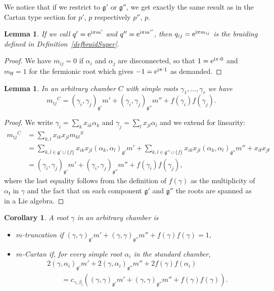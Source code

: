 \documentclass[pdftex]{sigma}%
\numberwithin{equation}{section}
\newtheorem{cor}[teo]{Corollary}
\newtheorem{lem}[teo]{Lemma}
\newcommand{\f}{\mathsf{f}}
\begin{document}
We notice that if we restrict to $\mathfrak{g'}$ or $\mathfrak{g''}$, we get exactly the same result as in the Cartan type section for $p'$, $p$ respectively $p''$, $p$.
\begin{lem}
If we call $q'={\rm e}^{{\rm i} \pi m'}$ and $q''={\rm e}^{{\rm i} \pi m''}$, then $q_{ij}={\rm e}^{{\rm i} \pi m_{ij}}$ is the braiding defined in Definition~{\rm \ref{defbraidSuper}}.
\end{lem}
\begin{proof}
We have $m_{ij}=0$ if $\alpha_i$ and $\alpha_j$ are disconnected, so that $1={\rm e}^{{\rm i} \pi \cdot 0}$ and $m_{\f\f}=1$ for the fermionic root which gives $-1 = {\rm e}^{{\rm i} \pi \cdot 1}$ as demanded.
\end{proof}

\begin{lem}In an arbitrary chamber $C$ with simple roots ${\gamma_1, \dots, \gamma_{r}}$ we have \[{m_{ij}}^C= (\gamma_i, \gamma_j)_{\mathfrak{g'}}m' + (\gamma_i, \gamma_j)_{\mathfrak{g''}}m'' +f(\gamma_i)f(\gamma_j).\]
\end{lem}
\begin{proof}
We write $\gamma_i = \sum_{k} x_{ik} \alpha_k$ and $\gamma_j = \sum_{l} x_{jl} \alpha_l$ and we extend for linearity:
\begin{align*}
{m_{ij}}^C &=  \sum_{k,l} x_{ik} x_{jl} {m_{kl}}^S \\
&= \sum_{k,l \in \mathfrak{g'} \cup \lbrace f \rbrace} x_{ik} x_{jl} (\alpha_k, \alpha_l)_{\mathfrak{g'}}m' + \sum_{k,l \in \mathfrak{g''} \cup \lbrace f \rbrace} x_{ik} x_{jl} (\alpha_k, \alpha_l)_{\mathfrak{g''}}m'' + x_{i\f} x_{j\f}   \\
&=  (\gamma_i, \gamma_j)_{\mathfrak{g'}}m' + (\gamma_i, \gamma_j)_{\mathfrak{g''}}m''+f(\gamma_i) f(\gamma_j),
\end{align*}
where the last equality follows from the definition of $f(\gamma)$ as the multiplicity of $\alpha_\f$ in $\gamma$ and the fact that on each component $\mathfrak{g'}$ and $\mathfrak{g''}$ the roots are spanned as in a Lie algebra.
\end{proof}

\begin{cor}\label{Mcondotherchamb}A root $\gamma$ in an arbitrary chamber is
\begin{itemize}\itemsep=0pt
	\item[--] $m$-truncation if $(\gamma,\gamma)_\mathfrak{g'} m' + (\gamma,\gamma)_\mathfrak{g''} m'' + f(\gamma)f(\gamma) =1$,
	\item[--] $m$-Cartan if, for every simple root $\alpha_i$ in the standard chamber,
	\begin{gather*}
	2(\gamma,\alpha_i)_\mathfrak{g'} m' + 2(\gamma,\alpha_i)_\mathfrak{g''} m'' + 2f(\gamma)f(\alpha_i) \\
\qquad {} = c_{\gamma,\beta_i}((\gamma,\gamma)_\mathfrak{g'} m' + (\gamma,\gamma)_\mathfrak{g''} m'' + f(\gamma)f(\gamma)).
	\end{gather*}
\end{itemize}
\end{cor}
\end{document}
